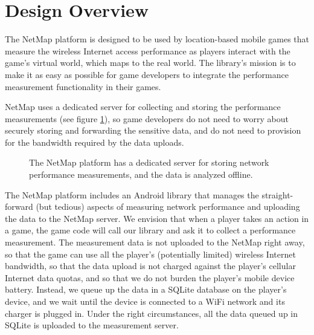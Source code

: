 \section{Design Overview}
\label{s:overview}

The NetMap platform is designed to be used by location-based mobile games that
measure the wireless Internet access performance as players interact with the
game's virtual world, which maps to the real world. The library's mission is to
make it as easy as possible for game developers to integrate the performance
measurement functionality in their games.

NetMap uses a dedicated server for collecting and storing the performance
measurements (see figure \ref{fig:servers}), so game developers do not need to
worry about securely storing and forwarding the sensitive data, and do not need
to provision for the bandwidth required by the data uploads.

\begin{figure}[hbtp]
  \caption{
    The NetMap platform has a dedicated server for storing network
    performance measurements, and the data is analyzed offline.
  }
  \label{fig:servers}
\end{figure}

The NetMap platform includes an Android library that manages the
straight-forward (but tedious) aspects of measuring network performance and
uploading the data to the NetMap server. We envision that when a player takes
an action in a game, the game code will call our library and ask it to collect
a performance measurement. The measurement data is not uploaded to the NetMap
right away, so that the game can use all the player's (potentially limited)
wireless Internet bandwidth, so that the data upload is not charged against
the player's cellular Internet data quotas, and so that we do not burden the
player's mobile device battery. Instead, we queue up the data in a SQLite
database on the player's device, and we wait until the device is connected to a
WiFi network and its charger is plugged in. Under the right circumstances, all
the data queued up in SQLite is uploaded to the measurement server.

